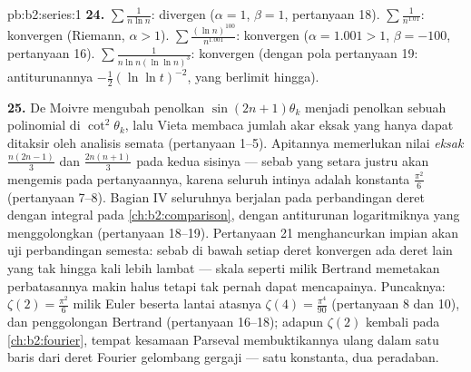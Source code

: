 \begin{solution}{pb:b2:series:1}
\textbf{24.} $\sum\frac1{n\ln n}$: divergen ($\alpha = 1$,
$\beta = 1$, pertanyaan 18). $\sum\frac1{n^{1.01}}$: konvergen
(Riemann, $\alpha > 1$). $\sum\frac{(\ln n)^{100}}{n^{1.001}}$:
konvergen ($\alpha = 1.001 > 1$, $\beta = -100$, pertanyaan 16).
$\sum\frac1{n\ln n(\ln\ln n)^3}$: konvergen (dengan pola pertanyaan
19: antiturunannya $-\frac12(\ln\ln t)^{-2}$, yang berlimit
hingga).

\textbf{25.} De Moivre mengubah penolkan $\sin(2n{+}1)
\theta_k$ menjadi penolkan sebuah polinomial di
$\cot^2\theta_k$, lalu Vieta membaca jumlah akar eksak yang hanya
dapat ditaksir oleh analisis semata (pertanyaan 1--5).
Apitannya memerlukan nilai \emph{eksak} $\frac{n(2n-1)}3$ dan
$\frac{2n(n+1)}3$ pada kedua sisinya --- sebab yang setara justru akan
mengemis pada pertanyaannya, karena seluruh intinya adalah konstanta
$\frac{\pi^2}6$ (pertanyaan 7--8). Bagian IV seluruhnya berjalan pada
perbandingan deret dengan integral pada \cref{ch:b2:comparison}, dengan
antiturunan logaritmiknya yang menggolongkan (pertanyaan
18--19). Pertanyaan 21 menghancurkan impian akan uji
perbandingan semesta: sebab di bawah setiap deret konvergen ada deret
lain yang tak hingga kali lebih lambat --- skala seperti milik Bertrand
memetakan perbatasannya makin halus tetapi tak pernah dapat mencapainya.
Puncaknya: $\zeta(2) = \frac{\pi^2}6$ milik Euler beserta lantai
atasnya $\zeta(4) = \frac{\pi^4}{90}$ (pertanyaan 8 dan 10), dan
penggolongan Bertrand (pertanyaan 16--18); adapun $\zeta(2)$ kembali
pada \cref{ch:b2:fourier}, tempat kesamaan Parseval membuktikannya
ulang dalam satu baris dari deret Fourier gelombang gergaji --- satu
konstanta, dua peradaban.

\end{solution}

